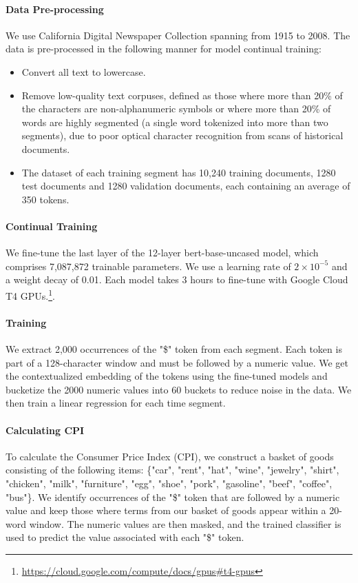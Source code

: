 \paragraph{Data Pre-processing}
We use California Digital Newspaper Collection \cite{CDNC2024data} spanning from 1915 to 2008. The data is pre-processed in the following manner for model continual training:
\begin{itemize}
    \item Convert all text to lowercase.
    \item Remove low-quality text corpuses, defined as those where more than 20\% of the characters are non-alphanumeric symbols or where more than 20\% of words are highly segmented (a single word tokenized into more than two segments), due to poor optical character recognition from scans of historical documents. 
    \item The dataset of each training segment has 10,240 training documents, 1280 test documents and 1280 validation documents, each containing an average of 350 tokens.
\end{itemize}

\paragraph{Continual Training}
We fine-tune the last layer of the 12-layer bert-base-uncased model, which comprises 7,087,872 trainable parameters. We use a learning rate of $2 \times 10^{-5}$ and a weight decay of 0.01. Each model takes 3 hours to fine-tune with Google Cloud T4 GPUs.\footnote{\url{https://cloud.google.com/compute/docs/gpus\#t4-gpus}}. 
\paragraph{Training \wc}
We extract 2,000 occurrences of the "\$" token from each segment. Each token is part of a 128-character window and must be followed by a numeric value. We get the contextualized embedding of the tokens using the fine-tuned models and bucketize the 2000 numeric values into 60 buckets to reduce noise in the data. We then train a linear regression for each time segment.

\paragraph{Calculating CPI}
To calculate the Consumer Price Index (CPI), we construct a basket of goods consisting of the following items: \{"car", "rent", "hat", "wine", "jewelry", "shirt", "chicken", "milk", "furniture", "egg", "shoe", "pork", "gasoline", "beef", "coffee", "bus"\}. We identify occurrences of the "\$" token that are followed by a numeric value and keep those where terms from our basket of goods appear within a 20-word window. The numeric values are then masked, and the trained \wc classifier is used to predict the value associated with each "\$" token.

